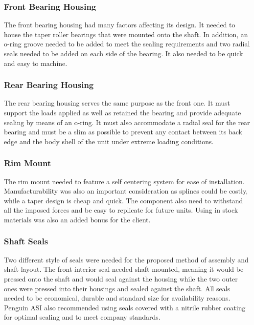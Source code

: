 \subsubsection{Front Bearing Housing}
The front bearing housing had many factors affecting its design. It needed to house the taper roller bearings that were mounted onto the shaft. In addition, an o-ring groove needed to be added to meet the sealing requirements and two radial seals needed to be added on each side of the bearing. It also needed to be quick and easy to machine. 

\subsubsection{Rear Bearing Housing}
The rear bearing housing serves the same purpose as the front one. It must support the loads applied as well as retained the bearing and provide adequate sealing by means of an o-ring. It must also accommodate a radial seal for the rear bearing and must be a slim as possible to prevent any contact between its back edge and the body shell of the unit under extreme loading conditions.

\subsubsection{Rim Mount}
The rim mount needed to feature a self centering system for ease of installation. Manufacturability was also an important consideration as splines could be costly, while a taper design is cheap and quick. The component also need to withstand all the imposed forces and be easy to replicate for future units. Using in stock materials was also an added bonus for the client.

\subsubsection{Shaft Seals}
Two different style of seals were needed for the proposed method of assembly and shaft layout. The front-interior seal needed shaft mounted, meaning it would be pressed onto the shaft and would seal against the housing while the two outer ones were pressed into their housings and sealed against the shaft. All seals needed to be economical, durable and standard size for availability reasons. Penguin ASI also recommended using seals covered with a nitrile rubber coating for optimal sealing and to meet company standards.

